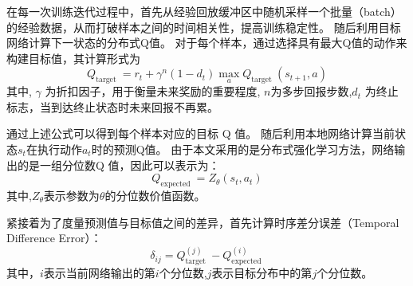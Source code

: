 在每一次训练迭代过程中，首先从经验回放缓冲区中随机采样一个批量（batch）的经验数据，从而打破样本之间的时间相关性，提高训练稳定性。
随后利用目标网络计算下一状态的分布式Q值。
对于每个样本，通过选择具有最大Q值的动作来构建目标值，其计算形式为
\begin{equation}
Q_{\text {target }}=r_{t}+\gamma^{n}\left(1-d_{t}\right) \max _{a} Q_{\text {target }}\left(s_{t+1}, a\right)
\end{equation}
其中, $\gamma$ 为折扣因子，用于衡量未来奖励的重要程度, $n$为多步回报步数,$d_{t}$  为终止标志，当到达终止状态时未来回报不再累。

通过上述公式可以得到每个样本对应的目标 Q 值。
随后利用本地网络计算当前状态$s_{t}$在执行动作$a_{t}$时的预测Q值。
由于本文采用的是分布式强化学习方法，网络输出的是一组分位数Q 值，因此可以表示为：
\begin{equation}
Q_{\text {expected }}=Z_{\theta}\left(s_{t}, a_{t}\right)
\end{equation}
其中,$Z_{\theta}$表示参数为$\theta$的分位数价值函数。

紧接着为了度量预测值与目标值之间的差异，首先计算时序差分误差（Temporal Difference Error）：
\begin{equation}
\delta_{i j}=Q_{\text {target }}^{(j)}-Q_{\text {expected }}^{(i)}
\end{equation}
其中，$i$表示当前网络输出的第$i$个分位数,$j$表示目标分布中的第$j$个分位数。

